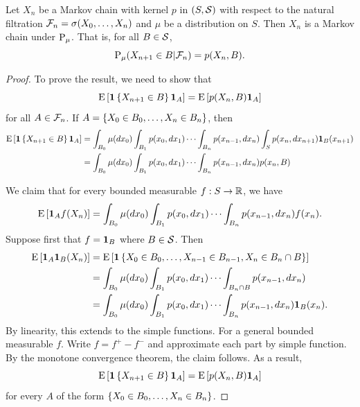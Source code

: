 \begin{proposition}
    Let $X_n$ be a Markov chain with kernel $p$ in $(S,\S)$ with respect to the natural 
    filtration $\F_n = \sigma(X_0,\ldots,X_n)$ and $\mu$ be a distribution on 
    $S$. Then $X_n$ is a Markov chain under $\P_\mu$. That is, for all $B\in\S$, 
    \begin{equation*}
        \P_\mu(X_{n+1}\in B|\F_n) = p(X_n, B).
    \end{equation*}
\end{proposition}
\begin{proof}
    To prove the result, we need to show that 
    \begin{equation*}
        \E\sbrc{\one\set{X_{n+1}\in B}\one_A} = \E\sbrc{p(X_n, B)\one_A}
    \end{equation*}
    for all $A\in\F_n$. If $A = \set{X_0\in B_0,\ldots,X_n\in B_n}$, then
    \begin{equation*}
        \begin{split}
            \E\sbrc{\one\set{X_{n+1}\in B}\one_A} 
            &= \int_{B_0}\mu(dx_0)\int_{B_1}p(x_0,dx_1)\cdots\int_{B_n}p(x_{n-1},dx_n)\int_S p(x_n,dx_{n+1})\one_B(x_{n+1}) \\ 
            &= \int_{B_0}\mu(dx_0)\int_{B_1}p(x_0,dx_1)\cdots\int_{B_n}p(x_{n-1},dx_n) p(x_n,B)
        \end{split}
    \end{equation*}

    We claim that for every bounded measurable $f:S\to\R$, we have 
    \begin{equation*}
        \E\sbrc{\one_Af(X_n)} = \int_{B_0}\mu(dx_0)\int_{B_1}p(x_0,dx_1)\cdots\int_{B_n}p(x_{n-1},dx_n)f(x_n). 
    \end{equation*}
    Suppose first that $f = \one_B$ where $B\in\S$. Then 
    \begin{equation*}
        \begin{split}
            \E\sbrc{\one_A\one_B(X_n)} &= \E\sbrc{\one\set{X_0\in B_0,\ldots,X_{n-1}\in B_{n-1},X_n\in B_n\cap B}}  \\ 
            &= \int_{B_0}\mu(dx_0)\int_{B_1}p(x_0,dx_1)\cdots\int_{B_n\cap B}p(x_{n-1},dx_n) \\ 
            &= \int_{B_0}\mu(dx_0)\int_{B_1}p(x_0,dx_1)\cdots\int_{B_n}p(x_{n-1},dx_n)\one_B(x_n).
        \end{split}
    \end{equation*}
    By linearity, this extends to the simple functions. For a general bounded measurable $f$. 
    Write $f = f^+ - f^-$ and approximate each part by simple function. By the 
    monotone convergence theorem, the claim follows. As a result, 
    \begin{equation*}
        \E\sbrc{\one\set{X_{n+1}\in B}\one_A} = \E\sbrc{p(X_n, B)\one_A}
    \end{equation*}
    for every $A$ of the form $\set{X_0\in B_0,\ldots,X_n\in B_n}$. 


\end{proof}
